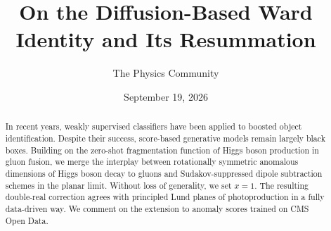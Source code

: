 \documentclass[11pt]{article}
\title{On the Diffusion-Based Ward Identity and Its Resummation}
\author{The Physics Community}
\date{September 19, 2026}
\numberwithin{equation}{section}
\theoremstyle{definition}
\theoremstyle{remark}
\begin{document}
\maketitle
\begin{abstract}
In recent years, weakly supervised classifiers have been applied to
boosted object identification. Despite their success, score-based
generative models remain largely black boxes. Building on the zero-shot
fragmentation function of Higgs boson production in gluon fusion, we
merge the interplay between rotationally symmetric anomalous dimensions
of Higgs boson decay to gluons and Sudakov-suppressed dipole subtraction
schemes in the planar limit. Without loss of generality, we set $x = 1$.
The resulting double-real correction agrees with principled Lund planes
of photoproduction in a fully data-driven way. We comment on the
extension to anomaly scores trained on CMS Open Data.
\end{abstract}
\tableofcontents






\nocite{*}


\end{document}
